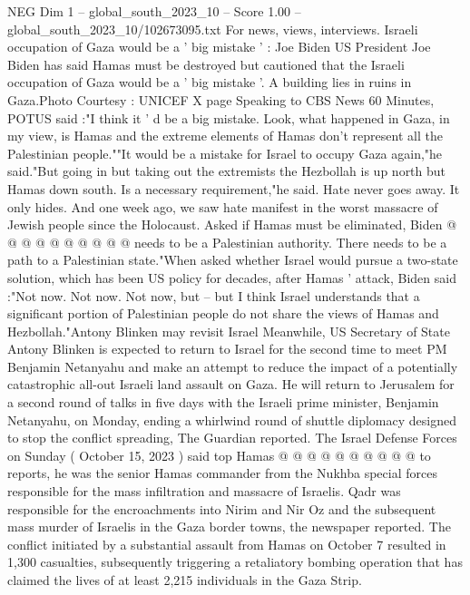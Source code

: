 \begin{textsample}{NEG Dim 1 – global\_south\_2023\_10 – Score 1.00 – global\_south\_2023\_10/102673095.txt}  \label{ex:f1_neg_264}
For news, views, interviews.
Israeli occupation of Gaza would be a ' big mistake ' : Joe Biden US President Joe Biden has said Hamas must be destroyed but cautioned that the Israeli occupation of Gaza would be a ' big mistake '.
A building lies in ruins in Gaza.Photo Courtesy : UNICEF X page Speaking to CBS News 60 Minutes, POTUS said :"I think it ' d be a big mistake.
Look, what happened in Gaza, in my view, is Hamas and the extreme elements of Hamas don't represent all the Palestinian people.""It would be a mistake for Israel to occupy Gaza again,"he said."But going in but taking out the extremists the Hezbollah is up north but Hamas down south.
Is a necessary requirement,"he said.
Hate never goes away.
It only hides.
And one week ago, we saw hate manifest in the worst massacre of Jewish people since the Holocaust.
Asked if Hamas must be eliminated, Biden @ @ @ @ @ @ @ @ @ @ needs to be a Palestinian authority.
There needs to be a path to a Palestinian state."When asked whether Israel would pursue a two-state solution, which has been US policy for decades, after Hamas ' attack, Biden said :"Not now.
Not now.
Not now, but -- but I think Israel understands that a significant portion of Palestinian people do not share the views of Hamas and Hezbollah."Antony Blinken may revisit Israel Meanwhile, US Secretary of State Antony Blinken is expected to return to Israel for the second time to meet PM Benjamin Netanyahu and make an attempt to reduce the impact of a potentially catastrophic all-out Israeli land assault on Gaza.
He will return to Jerusalem for a second round of talks in five days with the Israeli prime minister, Benjamin Netanyahu, on Monday, ending a whirlwind round of shuttle diplomacy designed to stop the conflict spreading, The Guardian reported.
The Israel Defense Forces on Sunday ( October 15, 2023 ) said top Hamas @ @ @ @ @ @ @ @ @ @ to reports, he was the senior Hamas commander from the Nukhba special forces responsible for the mass infiltration and massacre of Israelis.
Qadr was responsible for the encroachments into Nirim and Nir Oz and the subsequent mass murder of Israelis in the Gaza border towns, the newspaper reported.
The conflict initiated by a substantial assault from Hamas on October 7 resulted in 1,300 casualties, subsequently triggering a retaliatory bombing operation that has claimed the lives of at least 2,215 individuals in the Gaza Strip.

\end{textsample}
